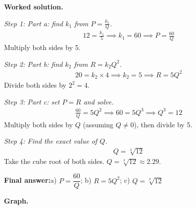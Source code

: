 \documentclass[11pt]{article}
\begin{document}
\textbf{Worked solution.}

\textit{Step 1: Part a: find \( k_1 \) from \( P = \frac{k_1}{Q} \).}
\[\begin{gathered}
12 = \frac{k_1}{5} \implies k_1 = 60 \implies P = \frac{60}{Q}
\end{gathered}\]
Multiply both sides by 5.

\textit{Step 2: Part b: find \( k_2 \) from \( R = k_2 Q^2 \).}
\[\begin{gathered}
20 = k_2 \times 4 \implies k_2 = 5 \implies R = 5Q^2
\end{gathered}\]
Divide both sides by \( 2^2 = 4 \).

\textit{Step 3: Part c: set \( P = R \) and solve.}
\[\begin{gathered}
\frac{60}{Q} = 5Q^2 \implies 60 = 5Q^3 \implies Q^3 = 12
\end{gathered}\]
Multiply both sides by \( Q \) (assuming \( Q \neq 0 \)), then divide by 5.

\textit{Step 4: Find the exact value of \( Q \).}
\[\begin{gathered}
Q = \sqrt[3]{12}
\end{gathered}\]
Take the cube root of both sides. \( Q = \sqrt[3]{12} \approx 2.29 \).

\begin{answerbox}
\textbf{Final answer:}\quad a) \(\displaystyle P = \dfrac{60}{Q}\); b) \(\displaystyle R = 5Q^2\); c) \(\displaystyle Q = \sqrt[3]{12}\)
\end{answerbox}
\textbf{Graph.}
\end{document}
